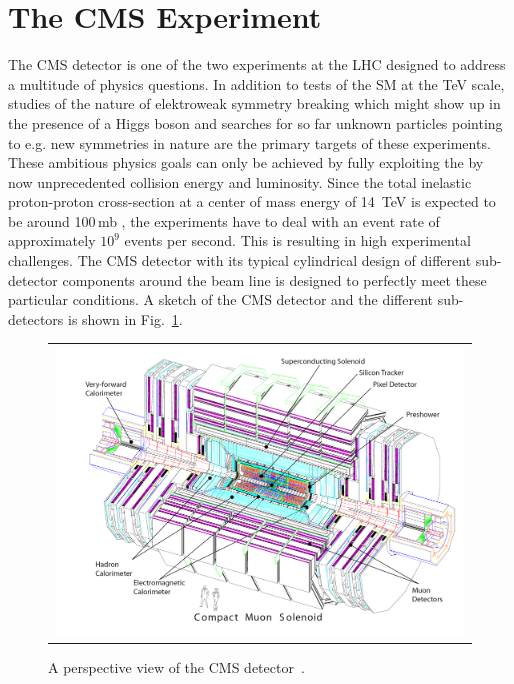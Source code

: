 \section{The CMS Experiment}
\label{sec:cms}
The CMS detector is one of the two experiments at the LHC designed to address a multitude of physics questions. In addition to tests of the SM at the TeV scale, studies of the nature of elektroweak symmetry breaking which might show up in the presence of a Higgs boson and searches for so far unknown particles pointing to e.g. new symmetries in nature are the primary targets of these experiments. These ambitious physics goals can only be achieved by fully exploiting the by now unprecedented collision energy and luminosity. Since the total inelastic proton-proton cross-section at a center of mass energy of 14~TeV is expected to be around 100\,mb , the experiments have to deal with an event rate of approximately $10^9$ events per second. This is resulting in high experimental challenges. The CMS detector with its typical cylindrical design of different sub-detector components around the beam line is designed to perfectly meet these particular conditions. A sketch of the CMS detector and the different sub-detectors is shown in Fig.~\ref{fig:CMS}.
\begin{figure}[!tp]
  \centering
  \begin{tabular}{c}
    \includegraphics[width=1.0\textwidth]{figures/Figures_Experimental_Apparatus_CMS_perspective.png}
  \end{tabular}
  \caption{A perspective view of the CMS detector~\cite{Chatrchyan:2008zzk}.}
  \label{fig:CMS}
\end{figure}
